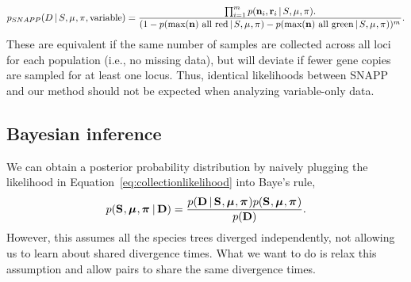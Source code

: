 \begin{equation}
    \pr_{\tiny SNAPP}(\comparisondata \given \sptree, \murate, \gfreq, \textrm{variable})
    =
    \frac{
        \prod_{i=1}^{\nloci}
        \pr(\leafallelecounts[i], \leafredallelecounts[i] \given \sptree, \murate, \gfreq).
    }{
        (1 - \pr(\maxleafallelecounts \textrm{ all red} \given \sptree, \murate, \gfreq)
        - \pr(\maxleafallelecounts \textrm{ all green} \given \sptree, \murate, \gfreq))^{\nloci}
    }.
    \label{eq:snappvariablecomparisonlikelihood}
\end{equation}
These are equivalent if the same number of samples are collected across all
loci for each population (i.e., no missing data), but will deviate if fewer
gene copies are sampled for at least one locus.
Thus, identical likelihoods between SNAPP and our method should not be expected
when analyzing variable-only data.

\subsection{Bayesian inference}

We can obtain a posterior probability distribution by naively plugging the
likelihood in Equation~\ref{eq:collectionlikelihood} into Baye's rule,
\begin{equation}
    \pr(
    \sptrees,
    \murates,
    \gfreqs
    \given
    \alldata
    )
    =
    \frac{
        \pr(
        \alldata
        \given
        \sptrees, \murates, \gfreqs
        )
        \pr(
        \sptrees,
        \murates,
        \gfreqs
        )
    }{
        \pr(
        \alldata
        )
    }.
    \label{eq:collectionindependentbayesrule}
\end{equation}
However, this assumes all the species trees diverged independently, not
allowing us to learn about shared divergence times.
What we want to do is relax this assumption and allow pairs to share the same
divergence times.

